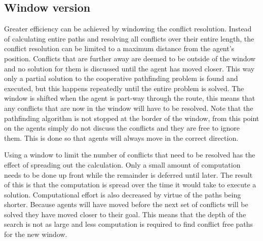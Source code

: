 \documentclass[a4paper]{article}
\begin{document}
\subsection{Window version}
Greater efficiency can be achieved by windowing the conflict resolution. 
Instead of calculating entire paths and resolving all conflicts over their 
entire length, the conflict resolution can be limited to a maximum distance 
from the agent's position. Conflicts that are further away are deemed to be 
outside of the window and no solution for them is discussed until the agent has 
moved closer. This way only a partial solution to the cooperative pathfinding 
problem is found and executed, but this happens repeatedly until the entire 
problem is solved. The window is shifted when the agent is part-way through the 
route, this means that any conflicts that are now in the window will have to be 
resolved. Note that the pathfinding algorithm is not stopped at the border of 
the window, from this point on the agents simply do not discuss the conflicts 
and they are free to ignore them. This is done so that agents will always move 
in the correct direction.

Using a window to limit the number of conflicts that need to be resolved has 
the effect of spreading out the calculation. Only a small amount of computation 
needs to be done up front while the remainder is deferred until later. The 
result of this is that the computation is spread over the time it would take to 
execute a solution. Computational effort is also decreased by virtue of the paths being shorter. Because agents will have moved before the next set of conflicts will be solved they have moved closer to their goal. This means that the depth of the search is not as large and less computation is required to find conflict free paths for the new window.



\end{document}
